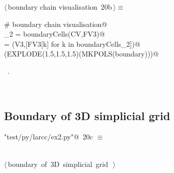 \documentclass[11pt,oneside]{article}	%
\begin{document}
\begin{flushleft} \small
\begin{minipage}{\linewidth} \label{scrap43}
\protect{}$\langle\,$boundary chain visualisation\nobreak\ {\footnotesize 20b}$\,\rangle\equiv$
\vspace{-1ex}
\begin{list}{}{} \item
\mbox{}\verb@# boundary chain visualisation@\\
\mbox{}\verb@boundaryCells_2 = boundaryCells(CV,FV3)@\\
\mbox{}\verb@boundary = (V3,[FV3[k] for k in boundaryCells_2])@\\
\mbox{}\verb@VIEW(EXPLODE(1.5,1.5,1.5)(MKPOLS(boundary)))@\\
\mbox{}\verb@@{\NWsep}
\end{list}
\vspace{-1ex}
\footnotesize\addtolength{\baselineskip}{-1ex}
\begin{list}{}{\setlength{\itemsep}{-\parsep}\setlength{\itemindent}{-\leftmargin}}
\item \NWtxtMacroRefIn\ .
\end{list}
\end{minipage}\\[4ex]
\end{flushleft}



\subsection{Boundary of 3D simplicial grid}

\begin{flushleft} \small
\begin{minipage}{\linewidth} \label{scrap44}
\protect{}\verb@"test/py/larcc/ex2.py"@\nobreak\ {\footnotesize 20c }$\equiv$
\vspace{-1ex}
\begin{list}{}{} \item
\mbox{}\verb@@\\
\mbox{}\verb@@\hbox{$\langle\,$boundary of 3D simplicial grid\nobreak\ {\footnotesize {}}$\,\rangle$}\verb@@\\
\mbox{}\verb@@{\NWsep}
\end{list}
\vspace{-2ex}
\end{minipage}\\[4ex]
\end{flushleft}
\end{document}

